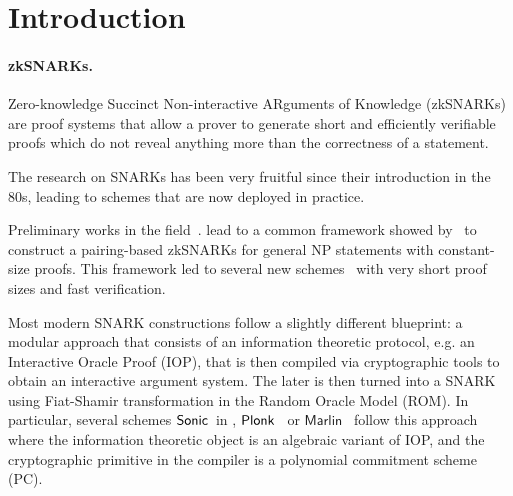 %
%


\section{Introduction}


\paragraph{zkSNARKs.}

Zero-knowledge Succinct Non-interactive ARguments of Knowledge (zkSNARKs) are  proof systems that allow a prover to generate
short and efficiently verifiable proofs which do not reveal anything more than the correctness of a statement.  

The research on SNARKs has been very fruitful since their introduction in the 80s, leading to schemes that are now deployed in practice.

Preliminary works in the field~\cite{IKO07,AC:Groth10a,TCC:Lipmaa12}.
lead to a common framework showed by~\cite{EC:GGPR13} to construct a pairing-based zkSNARKs for general NP statements with constant-size proofs.  
 This framework led to several new schemes~\cite{TCC:BCIOP13,SP:PHGR13,C:BCGTV13,AC:Lipmaa13,USENIX:BCTV14,EC:Groth16} with very short proof sizes and fast verification. 
 
 Most modern SNARK constructions follow a slightly different blueprint: a modular approach that consists of an information theoretic protocol, e.g. an Interactive Oracle Proof (IOP),  that is then compiled via cryptographic 
 tools to obtain an interactive argument system.  The later is then turned into a SNARK using Fiat-Shamir transformation in the Random Oracle Model (ROM). 
 In particular, several schemes 
 ${\textnormal{\textsf{Sonic}}}$~in \cite{CCS:MBKM19}, $\textnormal{\textsf{Plonk}}$~\cite{EPRINT:GabWilCio19} or $\textsf{Marlin}$~\cite{EC:CHMMVW20} 
follow this approach where the information theoretic object is an algebraic variant of IOP, and the cryptographic primitive in the compiler is a polynomial commitment scheme (PC).  

